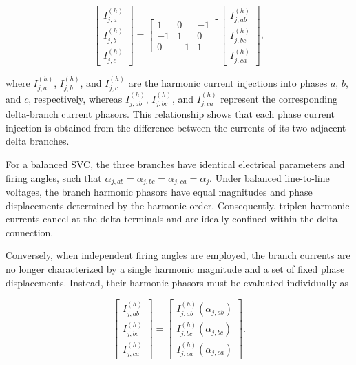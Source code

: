 \documentclass[journal]{IEEEtran}
\begin{document}
\begin{equation}
    \begin{bmatrix}
        I_{j,a}^{(h)}\\ I_{j,b}^{(h)}\\ I_{j,c}^{(h)}
    \end{bmatrix}
    =
    \begin{bmatrix}
        1&0&-1\\ -1&1&0\\ 0&-1&1
    \end{bmatrix}
    \begin{bmatrix}
        I_{j,ab}^{(h)}\\ I_{j,bc}^{(h)}\\ I_{j,ca}^{(h)}
    \end{bmatrix},
    \label{eq:delta_incidence}
\end{equation}

\noindent where $I_{j,a}^{(h)}$, $I_{j,b}^{(h)}$, and
$I_{j,c}^{(h)}$ are the harmonic current injections into phases $a$,
$b$, and $c$, respectively, whereas $I_{j,ab}^{(h)}$,
$I_{j,bc}^{(h)}$, and $I_{j,ca}^{(h)}$ represent the corresponding
delta-branch current phasors. This relationship shows that each phase
current injection is obtained from the difference between the currents
of its two adjacent delta branches.

For a balanced SVC, the three branches have identical electrical
parameters and firing angles, such that
$\alpha_{j,ab}=\alpha_{j,bc}=\alpha_{j,ca}=\alpha_j$.
Under balanced line-to-line voltages, the branch harmonic phasors have
equal magnitudes and phase displacements determined by the harmonic
order. Consequently, triplen harmonic currents cancel at the delta
terminals and are ideally confined within the delta connection.

Conversely, when independent firing angles are employed, the branch
currents are no longer characterized by a single harmonic magnitude
and a set of fixed phase displacements. Instead, their harmonic
phasors must be evaluated individually as

\begin{equation}
    \begin{bmatrix}
        I_{j,ab}^{(h)}\\
        I_{j,bc}^{(h)}\\
        I_{j,ca}^{(h)}
    \end{bmatrix}
    =
    \begin{bmatrix}
        I_{j,ab}^{(h)}(\alpha_{j,ab})\\
        I_{j,bc}^{(h)}(\alpha_{j,bc})\\
        I_{j,ca}^{(h)}(\alpha_{j,ca})
    \end{bmatrix}.
    \label{eq:unbalanced_branch_phasors}
\end{equation}
\end{document}

